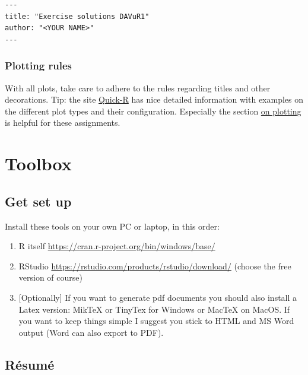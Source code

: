 \documentclass[]{book}
\providecommand{\tightlist}{%
  \setlength{\itemsep}{0pt}\setlength{\parskip}{0pt}}
\begin{document}
\begin{verbatim}
---
title: "Exercise solutions DAVuR1"
author: "<YOUR NAME>"
---
\end{verbatim}

\hypertarget{plotting-rules}{%
\subsubsection*{Plotting rules}\label{plotting-rules}}

With all plots, take care to adhere to the rules regarding titles and other decorations. Tip: the site \href{http://www.statmethods.net/}{Quick-R} has nice detailed information with examples on the different plot types and their configuration. Especially the section \href{http://www.statmethods.net/graphs/index.html}{on plotting} is helpful for these assignments.

\hypertarget{toolbox-1}{%
\section{Toolbox}\label{toolbox-1}}

\hypertarget{get-set-up}{%
\subsection{Get set up}\label{get-set-up}}

Install these tools on your own PC or laptop, in this order:

\begin{enumerate}
\def\labelenumi{\arabic{enumi}.}
\tightlist
\item
  R itself \url{https://cran.r-project.org/bin/windows/base/}\\
\item
  RStudio \url{https://rstudio.com/products/rstudio/download/} (choose the free version of course)
\item
  {[}Optionally{]} If you want to generate pdf documents you should also install a Latex version: MikTeX or TinyTex for Windows or MacTeX on MacOS. If you want to keep things simple I suggest you stick to HTML and MS Word output (Word can also export to PDF).
\end{enumerate}

\hypertarget{resume}{%
\subsection{Résumé}\label{resume}}
\end{document}
